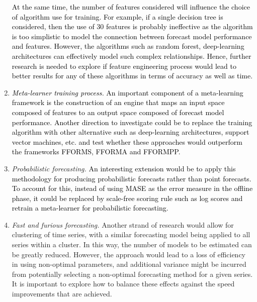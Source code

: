 \documentclass{monashthesis}
\begin{document}
\begin{enumerate}
  \textcolor{black}{At the same time, the number of features considered will influence the choice of algorithm use for training. For example, if a single decision tree is considered, then the use of 30 features is probably ineffective as the algorithm is too simplistic to model the connection between forecast model performance and features.  However, the algorithms such as random forest, deep-learning architectures can effectively model such complex relationships. Hence, further research is needed to explore if feature engineering process would lead to better results for any of these algorithms in terms of accuracy as well as time.}
\item
  \textcolor{black}{\textit{Meta-learner training process.} An important component of a meta-learning framework is the construction of an engine that maps an input space composed of features to an output space composed of forecast model performance. Another direction to investigate could be to replace the training algorithm with other alternative such as deep-learning architectures, support vector machines, etc. and test whether these approaches would outperform the frameworks FFORMS, FFORMA and FFORMPP.}
\item
  \emph{Probabilistic forecasting.} \textcolor{black}{An interesting extension would be to apply this methodology for producing probabilistic forecasts rather than point forecasts. To account for this, instead of using MASE as the error measure in the offline phase, it could be replaced by scale-free scoring rule such as log scores and retrain a meta-learner for probabilistic forecasting.}
\item
  \emph{Fast and furious forecasting.} Another strand of research would allow for clustering of time series, with a similar forecasting model being applied to all series within a cluster. In this way, the number of models to be estimated can be greatly reduced. However, the approach would lead to a loss of efficiency in using non-optimal parameters, and additional variance might be incurred from potentially selecting a non-optimal forecasting method for a given series. It is important to explore how to balance these effects against the speed improvements that are achieved.
\end{enumerate}

\printbibliography[heading=bibintoc]
\end{document}
